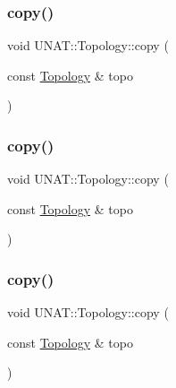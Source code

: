 \mbox{\label{classUNAT_1_1Topology_a7c875a40bf0676622b5cb4915747417d}} 
\subsubsection{\texorpdfstring{copy()}{copy()}\hspace{0.1cm}{\footnotesize\ttfamily [1/3]}}
{\footnotesize\ttfamily void U\+N\+A\+T\+::\+Topology\+::copy (\begin{DoxyParamCaption}\item[{const \mbox{\hyperlink{classUNAT_1_1Topology}{Topology}} \&}]{topo }\end{DoxyParamCaption})\hspace{0.3cm}{\ttfamily [private]}}

\mbox{\label{classUNAT_1_1Topology_a7c875a40bf0676622b5cb4915747417d}} 
\subsubsection{\texorpdfstring{copy()}{copy()}\hspace{0.1cm}{\footnotesize\ttfamily [2/3]}}
{\footnotesize\ttfamily void U\+N\+A\+T\+::\+Topology\+::copy (\begin{DoxyParamCaption}\item[{const \mbox{\hyperlink{classUNAT_1_1Topology}{Topology}} \&}]{topo }\end{DoxyParamCaption})\hspace{0.3cm}{\ttfamily [private]}}

\mbox{\label{classUNAT_1_1Topology_a7c875a40bf0676622b5cb4915747417d}} 
\subsubsection{\texorpdfstring{copy()}{copy()}\hspace{0.1cm}{\footnotesize\ttfamily [3/3]}}
{\footnotesize\ttfamily void U\+N\+A\+T\+::\+Topology\+::copy (\begin{DoxyParamCaption}\item[{const \mbox{\hyperlink{classUNAT_1_1Topology}{Topology}} \&}]{topo }\end{DoxyParamCaption})\hspace{0.3cm}{\ttfamily [private]}}

